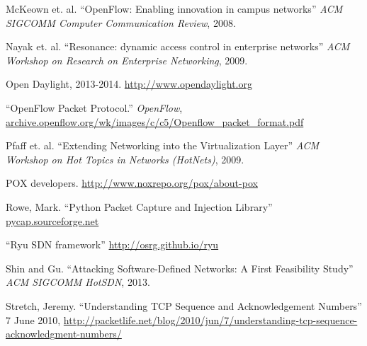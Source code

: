 \begin{thebibliography}{99}
 McKeown et. al. ``OpenFlow: Enabling innovation in campus networks'' \emph{ACM SIGCOMM Computer Communication Review}, 2008.

 Nayak et. al. ``Resonance: dynamic access control in enterprise networks'' \emph{ACM Workshop on Research on Enterprise Networking}, 2009.

 Open Daylight, 2013-2014. \url{http://www.opendaylight.org}

 ``OpenFlow Packet Protocol.'' \emph{OpenFlow}, \url{archive.openflow.org/wk/images/c/c5/Openflow_packet_format.pdf}

 Pfaff et. al. ``Extending Networking into the Virtualization Layer'' \emph{ACM Workshop on Hot Topics in Networks (HotNets)}, 2009.

 POX developers. \url{http://www.noxrepo.org/pox/about-pox}

 Rowe, Mark. ``Python Packet Capture and Injection Library'' \url{pycap.sourceforge.net}

 ``Ryu SDN framework'' \url{http://osrg.github.io/ryu}

 Shin and Gu. ``Attacking Software-Defined Networks: A First Feasibility Study'' \emph{ACM SIGCOMM HotSDN}, 2013.

 Stretch, Jeremy. ``Understanding TCP Sequence and Acknowledgement Numbers'' 7 June 2010, \url{http://packetlife.net/blog/2010/jun/7/understanding-tcp-sequence-acknowledgment-numbers/}

\end{thebibliography}
